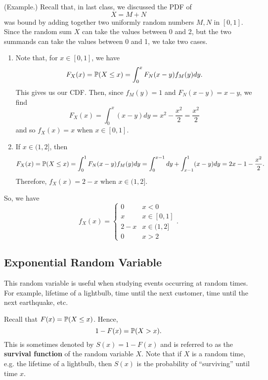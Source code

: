 \documentclass[letterpaper]{article}
\begin{document}
\begin{mdframed}[]
    (Example.) Recall that, in last class, we discussed the PDF of 
    \[X = M + N\]
    was bound by adding together two uniformly random numbers $M, N$ in $[0, 1]$. Since the random sum $X$ can take the values between 0 and 2, but the two summands can take the values between 0 and 1, we take two cases. 
    
    \begin{enumerate}
        \item Note that, for $x \in [0, 1]$, we have 
        \[F_{X}(x) = \mathbb{P}(X \leq x) = \int_{0}^{x} F_{N}(x - y)f_{M}(y)dy.\]
        This gives us our CDF. Then, since $f_{M}(y) = 1$ and $F_{N}(x - y) = x - y$, we find 
        \[F_{X}(x) = \int_0^x (x - y)dy = x^2 - \frac{x^2}{2} = \frac{x^2}{2}\]
        and so $f_{X}(x) = x$ when $x \in [0, 1]$. 


        \item If $x \in (1, 2]$, then 
        \[F_{X}(x) = \mathbb{P}(X \leq x) = \int_0^1 F_N (x - y) f_M (y) dy = \int_{0}^{x - 1} dy + \int_{x - 1}^1 (x - y) dy = 2x - 1 - \frac{x^2}{2}.\]
        Therefore, $f_X (x) = 2 - x$ when $x \in (1, 2]$. 
    \end{enumerate}

    So, we have 
    \[f_X (x) = \begin{cases}
        0 & x < 0 \\ 
        x & x \in [0, 1] \\ 
        2 - x & x \in (1, 2] \\ 
        0 & x > 2
    \end{cases}.\]
\end{mdframed}


\subsection{Exponential Random Variable}
This random variable is useful when studying events occurring at random times. For example, lifetime of a lightbulb, time until the next customer, time until the next earthquake, etc. 

\bigskip 

Recall that $F(x) = \mathbb{P}(X \leq x)$. Hence,
\[1 - F(x) = \mathbb{P}(X > x).\]
This is sometimes denoted by $S(x) = 1 - F(x)$ and is referred to as the \textbf{survival function} of the random variable $X$. Note that if $X$ is a random time, e.g. the lifetime of a lightbulb, then $S(x)$ is the probability of ``surviving'' until time $x$. 
\end{document}
